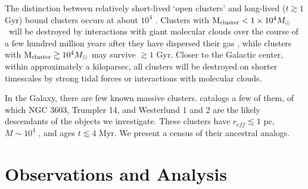 The distinction between relatively short-lived `open clusters' and long-lived
($t\gtrsim1$ Gyr) bound clusters occurs at about $10^4$ \msun
\citep{PortegiesZwart2010}.  Clusters with ${\rm M}_{\rm cluster} < 1\times10^{4} M_{\odot}$~will
be destroyed by interactions with giant molecular clouds over the course of a
few hundred million years after they have dispersed their gas
\citep{Kruijssen2011}, while clusters with ${\rm M}_{\rm cluster}\gtrsim10^4 M_{\odot}$ may
survive $\gtrsim 1$ Gyr.  Closer to the Galactic center, within approximately a
kiloparsec, all clusters will be destroyed on shorter timescales by strong
tidal forces or interactions with molecular clouds.

In the Galaxy, there are few known massive clusters.
\citet{PortegiesZwart2010} catalogs a few of them, of which NGC 3603, Trumpler
14, and Westerlund 1 and 2 are the likely descendants of the objects we
investigate.  These clusters have $r_{eff} \lesssim 1$ pc, $M\sim10^4$ \msun,
and ages $t\lesssim4$ Myr.  We present a census of their ancestral analogs.



\section{Observations and Analysis}
\label{sec:ympcobservations}

